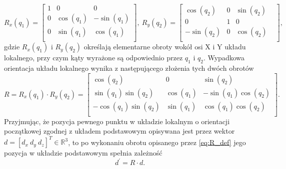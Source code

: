 \begin{equation}
R_x(q_1) = 
\begin{bmatrix}
1 & 0 & 0\\
0 & \cos(q_1) & -\sin(q_1)\\
0 & \sin(q_1) & \cos(q_1)\\
\end{bmatrix},\ 
R_y(q_2) = 
\begin{bmatrix}
\cos(q_2) & 0 & \sin(q_2)\\
0 & 1 & 0 &\\
-\sin(q_2) & 0 & \cos(q_2)\\
\end{bmatrix},
\end{equation}
%
gdzie $R_x(q_1)$ i $R_y(q_2)$ określają elementarne obroty wokół osi X i Y układu lokalnego, przy czym kąty wyrażone są odpowiednio przez $q_1$ i $q_2$.
Wypadkowa orientacja układu lokalnego wynika z następującego złożenia tych dwóch obrotów
%
\begin{equation}\label{eq:R_def}
R=R_x(q_1) \cdot R_y(q_2) =
\begin{bmatrix}
\cos(q_2) & 0 & \sin(q_2)\\
\sin(q_1) \sin(q_2) & \cos(q_1) & -\sin(q_1) \cos(q_2)\\
-\cos(q_1) \sin(q_2) & \sin(q_1) & \cos(q_1) \cos(q_2)\\
\end{bmatrix}.
\end{equation}
%
Przyjmując, że pozycja pewnego punktu w układzie lokalnym o orientacji początkowej zgodnej z układem podstawowym opisywana jest przez wektor $d=[d_x\ d_y\  d_z]^T\in\mathbb{R}^3$, to po wykonaniu obrotu opisanego przez \eqref{eq:R_def} jego pozycja w układzie podstawowym spełnia zależność
%
\begin{equation}
d^{'}=R \cdot d.    
\end{equation}
%
%

